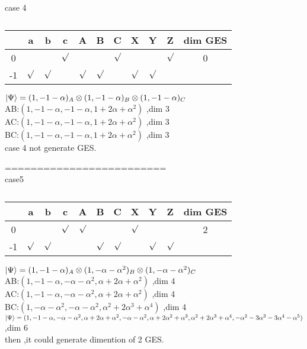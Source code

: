 \documentclass[12pt,twoside]{report}
\begin{document}
	  
	  
	
	case 4
	
	\begin{table}[ht]
		\centering
		\begin{tabular}{|c|c|c|c|c|c|c|c|c|c|c|}
			\hline
			& a & b  &  c & A & B & C & X & Y & Z & dim GES  \\
			\hline
			0	& & &$\surd$ & & &$\surd$ & & &$\surd$  & 0\\
			\hline
			-1 &$\surd$	& $\surd$& & $\surd$&$\surd$ & &$\surd$ &$\surd$ &  &\\
			\hline 		
			
		\end{tabular}
		\caption{ }
	\end{table}
$ \ket{\Psi}=(1,-1-\alpha)_{A}\otimes(1,-1-\alpha)_{B}\otimes(1,-1-\alpha)_{C} $\\
AB:$(1,-1-\alpha,-1-\alpha,1+2\alpha+\alpha^{2})$ ,dim 3\\
AC:$(1,-1-\alpha,-1-\alpha,1+2\alpha+\alpha^{2})$ ,dim 3\\
BC:$(1,-1-\alpha,-1-\alpha,1+2\alpha+\alpha^{2})$ ,dim 3\\
case 4 not generate GES.

=========================\\
case5
	\begin{table}[ht]
	\centering
	\begin{tabular}{|c|c|c|c|c|c|c|c|c|c|c|}
		\hline
		& a & b  &  c & A & B & C & X & Y & Z & dim GES  \\
		\hline
		0	& & &$\surd$ & $\surd$& & & $\surd$& &  & 2\\
		\hline
		-1 &$\surd$	& $\surd$& & & $\surd$& $\surd$& &$\surd$ &$\surd$  &\\
		\hline 		
		 
	\end{tabular}
	\caption{ }
\end{table}

$ \ket{\Psi}=(1,-1-\alpha)_{A}\otimes(1,-\alpha-\alpha^{2})_{B}\otimes(1,-\alpha-\alpha^{2})_{C} $\\
AB:$(1,-1-\alpha,-\alpha-\alpha^{2},\alpha+2\alpha+\alpha^{2})$ ,dim 4\\
AC:$(1,-1-\alpha,-\alpha-\alpha^{2},\alpha+2\alpha+\alpha^{2})$ ,dim 4\\
BC:$(1,-\alpha-\alpha^{2},-\alpha-\alpha^{2},\alpha^{2}+2\alpha^{3}+\alpha^{4})$ ,dim 4\\

$ \ket{\Psi}=(1,-1-\alpha,-\alpha-\alpha^{2},\alpha+2\alpha+\alpha^{2},-\alpha-\alpha^{2},\alpha+2\alpha^{2}+\alpha^{3},\alpha^{2}+2\alpha^{3}+\alpha^{4},-\alpha^{2}-3\alpha^{3}-3\alpha^{4}-\alpha^{5}) $,dim 6\\
then ,it could generate dimention of 2 GES.
\end{document}
